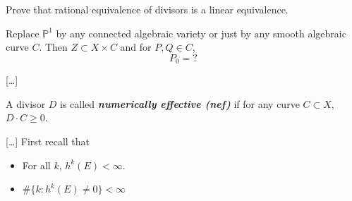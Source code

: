 \documentclass{article}
\renewcommand{\P}{\mathbb{P}}
\begin{document}
\begin{exercise}
	Prove that rational equivalence of divisors is a linear equivalence.
\end{exercise}
\begin{defn}
	Replace $\P^1$ by any connected algebraic variety or just by any smooth algebraic curve $C$. Then $Z\subset X\times C$ and for $P,Q\in C$,
	\[P_0=?\]
\end{defn}
[…]
\begin{defn}
	A divisor $D$ is called \textbf{\textit{numerically effective (nef)}} if for any curve $C\subset X$, $D\cdot C\geq0$.
\end{defn}
[…]
First recall that
\begin{thm}[Grauert]\leavevmode
	\begin{itemize}
		\item For all $k$, $h^k(E)<\infty$.
		\item $\#\{k:h^k(E)\neq0\}<\infty$
	\end{itemize}
\end{thm}
\end{document}
